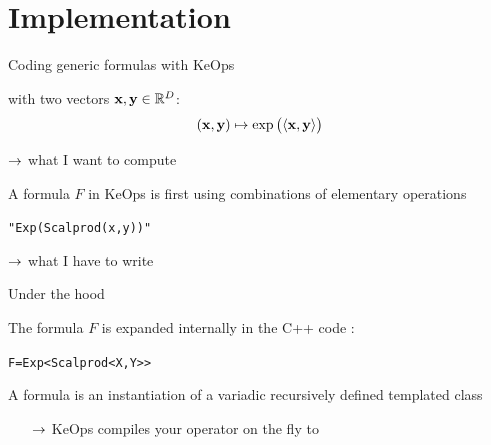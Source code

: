 \documentclass[12pt,aspectratio=1610]{beamer}
\begin{document}
\section{Implementation}

\begin{frame}{Coding generic formulas with KeOps}

\vspace{0.4cm}

\hypertarget{implementation}{}

 with two vectors $\mathbf{x},\mathbf{y}\in\mathbb{R}^D$:
\[
(\mathbf{x}, \mathbf{y}) \mapsto \exp\big(\langle \mathbf{x}, \mathbf{y}\rangle\big)
\]

\begin{center}
$\rightarrow$ what I want to compute
\end{center}\bigskip

A formula $F$ in KeOps is first  using combinations of elementary operations
\begin{center}
\texttt{"Exp(Scalprod(x,y))"}
\end{center}

\begin{center}
$\rightarrow$ what I have to write
\end{center}

\end{frame}


\begin{frame}{Under the hood}

The formula $F$ is expanded internally in the C++ code :
\begin{center}
\texttt{F=Exp<Scalprod<X,Y>{}>}
\end{center}
\bigskip

A formula is an instantiation of a variadic recursively defined templated class\medskip

\begin{itemize}
\item[$\rightarrow$] KeOps compiles your operator on the fly to 
\end{itemize}

\end{frame}
\end{document}

